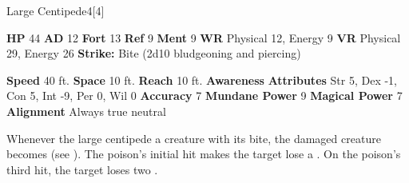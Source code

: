       
  \begin{monsubsection}{Large Centipede}{4}[4]
    \vspace{-1em}\vspace{-1em}
    \vspace{0em}

    
    

    \begin{spellcontent}
      \begin{spelltargetinginfo}
        \pari \textbf{HP} 44 \monsep
          \textbf{AD} 12 \monsep
          \textbf{Fort} 13 \monsep
          \textbf{Ref} 9 \monsep
          \textbf{Ment} 9
        \pari \textbf{WR} Physical 12, Energy 9 \monsep
        \textbf{VR} Physical 29, Energy 26
        \pari \textbf{Strike:}
            Bite  (2d10 bludgeoning and piercing)
      \end{spelltargetinginfo}
    \end{spellcontent}
    \begin{monsterfooter}
      \pari \textbf{Speed} 40 ft. \monsep
        \textbf{Space} 10 ft. \monsep
        \textbf{Reach} 10 ft.
      \pari \textbf{Awareness} 
      \pari \textbf{Attributes}
        Str 5, Dex -1,
        Con 5, Int -9,
        Per 0, Wil 0
      \pari \textbf{Accuracy} 7 \monsep
        \textbf{Mundane Power} 9 \monsep
      \textbf{Magical Power} 7
      \pari \textbf{Alignment} Always true neutral
    \end{monsterfooter}
  \end{monsubsection}
        Whenever the large centipede  a creature with its bite,
          the damaged creature becomes  (see ).
        The poison's initial hit makes the target lose a .
        On the poison's third hit, the target loses two .
  

